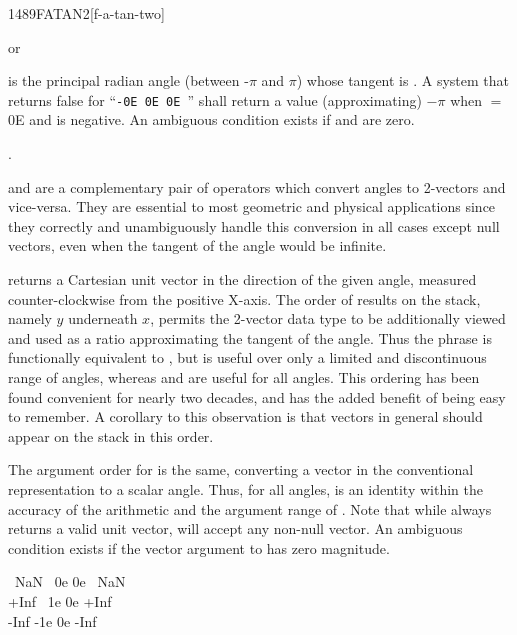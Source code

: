\begin{worddef}{1489}{FATAN2}[f-a-tan-two]
\item {} or

	 is the principal radian angle (between -$\pi$ and $\pi$)
	whose tangent is .
	A system that returns false for ``\texttt{-0E 0E 0E }''
	shall return a value (approximating) $-\pi$ when  $=$ 0E
	and  is negative.
	An ambiguous condition exists if  and  are
	zero.

\see {}.

	\begin{rationale} %
		 and  are a complementary pair of
		operators which convert angles to 2-vectors and vice-versa.
		They are essential to most geometric and physical applications
		since they correctly and unambiguously handle this conversion
		in all cases except null vectors, even when the tangent of the
		angle would be infinite.

		 returns a Cartesian unit vector in the direction
		of the given angle, measured counter-clockwise from the positive
		X-axis. The order of results on the stack, namely $y$ underneath
		$x$, permits the 2-vector data type to be additionally viewed
		and used as a ratio approximating the tangent of the angle.
		Thus the phrase   is functionally
		equivalent to , but is useful over only a limited
		and discontinuous range of angles, whereas  and
		 are useful for all angles. This ordering has
		been found convenient for nearly two decades, and has the
		added benefit of being easy to remember. A corollary to this
		observation is that vectors in general should appear on the
		stack in this order.

		The argument order for  is the same, converting a
		vector in the conventional representation to a scalar angle.
		Thus, for all angles,   is an identity
		within the accuracy of the arithmetic and the argument range of
		. Note that while  always returns a
		valid unit vector,  will accept any non-null vector.
		An ambiguous condition exists if the vector argument to
		 has zero magnitude.
	\end{rationale}

	\begin{testing}\ttfamily
		\word[tools]{[UNDEFINED]} ~NaN \word[tools]{[IF]} ~0e 0e   ~NaN \word[tools]{[THEN]} \\
		\word[tools]{[UNDEFINED]} +Inf \word[tools]{[IF]} ~1e 0e   +Inf \word[tools]{[THEN]} \\
		\word[tools]{[UNDEFINED]} -Inf \word[tools]{[IF]} -1e 0e   -Inf \word[tools]{[THEN]}


\end{testing}
\end{worddef}
